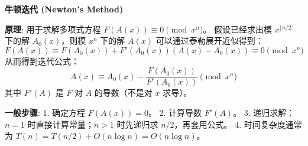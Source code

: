 \textbf{牛顿迭代 (Newton's Method)}

\noindent
\textbf{原理}:
用于求解多项式方程 $F(A(x)) \equiv 0 \pmod{x^n}$。
假设已经求出模 $x^{\lceil n/2 \rceil}$ 下的解 $A_0(x)$，则模 $x^n$ 下的解 $A(x)$ 可以通过泰勒展开近似得到：
\[ F(A(x)) \equiv F(A_0(x)) + F'(A_0(x)) (A(x) - A_0(x)) \equiv 0 \pmod{x^n} \]
从而得到迭代公式：
\[ A(x) \equiv A_0(x) - \frac{F(A_0(x))}{F'(A_0(x))} \pmod{x^n} \]
其中 $F'(A)$ 是 $F$ 对 $A$ 的导数（不是对 $x$ 求导）。

\noindent
\textbf{一般步骤}:
1. 确定方程 $F(A(x)) = 0$。
2. 计算导数 $F'(A)$。
3. 递归求解：$n=1$ 时直接计算常量；$n>1$ 时先递归求 $n/2$，再套用公式。
4. 时间复杂度通常为 $T(n) = T(n/2) + O(n \log n) = O(n \log n)$。
